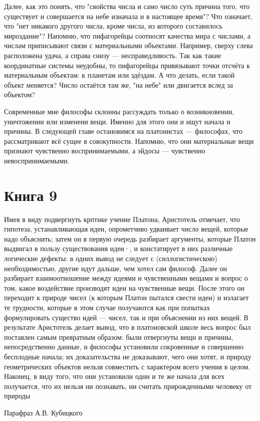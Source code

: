 \documentclass[oneside, 17pt, dvipsnames]{extbook}
\begin{document}
Далее, как это понять, что "свойства числа и само число суть причина того, что существует и совершается на небе изначала и в настоящее время"? Что означает, что "нет никакого другого числа, кроме числа, из которого составилось мироздание"? Напомню, что пифагорейцы соотносят качества мира с числами, а числам приписывают связи с материальными объектами. Например, сверху слева расположена удача, а справа снизу --- несправедливость. Так как такие координатные системы неудобны, то пифагорейцы привязывают точки отсчёта к материальным объектам: к планетам или здёздам. А что делать, если такой объект меняется? Число остаётся там же, "на небе" или двигается вслед за объектом?

Современные мне философы склонны рассуждать только о возникновении, уничтожении или изменеии вещи. Именно для этого они и ищут начала и причины. В следующей главе остановимся на платонистах --- философах, что рассматривают всё сущее в совокупности. Напомню, что они материальные вещи признают чувственно воспринимаемыми, а эйдосы --- чувственно невоспринимаемыми.







\newpage
\section{Книга 9}

\epigraph{
Имея в виду подвергнуть крптике учение Платона, Аристотель отмечает, что гипотеза, устанавливающая идеи, опрометчиво удваивает число вещей, которые надо объяснить; затем он в первую очередь разбирает аргументы, которые Платон выдвигал в пользу существования идеи·, и констатирует в них различные логические дефекты: в одних вывод не следует с (силлогистическою) необходимостью, другие идут дальше, чем хотел сам философ. Далее он разбирает взаимоотношение между идеями и чувственнымн вещами и вопрос о том, какое воздействие производят идеи на чувственные вещи. После этого он переходит к природе чисел (к которым Платон пытался свести идеи) и излагает те трудности, которые в этом случае получаются как при попытках формулировать существо идей --- чисел, так и при объяснении из них вещей. В результате Аристотель делает вывод, что в платоновской школе весь вопрос был поставлен самым превратным образом: были отвергнуты вещи и причины, непосредственно данные, и философы установили сокровенные и совершенно бесплодные начала; их доказательства не доказывают, чего они хотят, и природу геометрических объектов нельзя совместить с характером всего учения в целом. Наконец, в виду того, что они установили одни и те же начала для всех получается, что их нельзя ни познавать, ни считать прирожденными человеку от природы
}{Парафраз А.В. Кубицкого}
\end{document}
